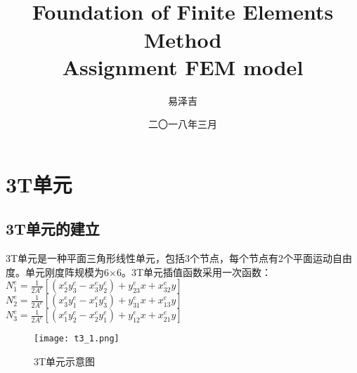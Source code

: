 \documentclass[forprint]{WHUBachelor}
\begin{document}

\title{\\Foundation of Finite Elements Method\\Assignment FEM model}

\author{易泽吉}                            %



\date{二〇一八年三月}                    %


\maketitle
\frontmatter
{}              %

\mainmatter %

\section {3T单元}
\subsection {3T单元的建立}
3T单元是一种平面三角形线性单元，包括3个节点，每个节点有2个平面运动自由度。单元刚度阵规模为6×6。3T单元插值函数采用一次函数：
$ N_{1}^{e}=\frac{1}{2 A^{e}}\left[\left(x_{2}^{e} y_{3}^{e}-x_{3}^{e} y_{2}^{e}\right)+y_{23}^{e} x+x_{32}^{e} y\right] $
$ N_{2}^{e}=\frac{1}{2 A^{e}}\left[\left(x_{3}^{e} y_{1}^{e}-x_{1}^{e} y_{3}^{e}\right)+y_{31}^{e} x+x_{13}^{e} y\right] $
$ N_{3}^{e}=\frac{1}{2 A^{e}}\left[\left(x_{1}^{e} y_{2}^{e}-x_{2}^{e} y_{1}^{e}\right)+y_{12}^{e} x+x_{21}^{e} y\right] $

\begin{figure}[H]
\centering  
\texttt{[image: t3\_1.png]} 
\caption{3T单元示意图} 
\label{f1.1} 
\end{figure}
\end{document}
